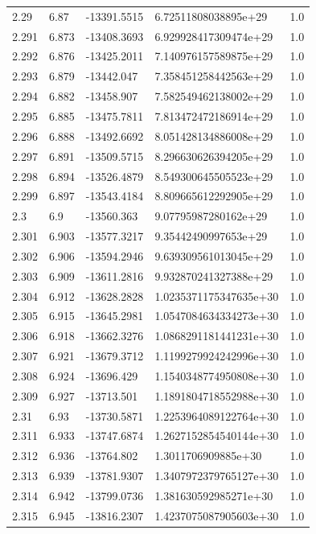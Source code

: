\begin{tabular}{lllll}
2.29 & 6.87 & -13391.5515 & 6.72511808038895e+29 & 1.0 \\
2.291 & 6.873 & -13408.3693 & 6.929928417309474e+29 & 1.0 \\
2.292 & 6.876 & -13425.2011 & 7.140976157589875e+29 & 1.0 \\
2.293 & 6.879 & -13442.047 & 7.358451258442563e+29 & 1.0 \\
2.294 & 6.882 & -13458.907 & 7.582549462138002e+29 & 1.0 \\
2.295 & 6.885 & -13475.7811 & 7.813472472186914e+29 & 1.0 \\
2.296 & 6.888 & -13492.6692 & 8.051428134886008e+29 & 1.0 \\
2.297 & 6.891 & -13509.5715 & 8.296630626394205e+29 & 1.0 \\
2.298 & 6.894 & -13526.4879 & 8.549300645505523e+29 & 1.0 \\
2.299 & 6.897 & -13543.4184 & 8.809665612292905e+29 & 1.0 \\
2.3 & 6.9 & -13560.363 & 9.07795987280162e+29 & 1.0 \\
2.301 & 6.903 & -13577.3217 & 9.35442490997653e+29 & 1.0 \\
2.302 & 6.906 & -13594.2946 & 9.639309561013045e+29 & 1.0 \\
2.303 & 6.909 & -13611.2816 & 9.932870241327388e+29 & 1.0 \\
2.304 & 6.912 & -13628.2828 & 1.0235371175347635e+30 & 1.0 \\
2.305 & 6.915 & -13645.2981 & 1.0547084634334273e+30 & 1.0 \\
2.306 & 6.918 & -13662.3276 & 1.0868291181441231e+30 & 1.0 \\
2.307 & 6.921 & -13679.3712 & 1.1199279924242996e+30 & 1.0 \\
2.308 & 6.924 & -13696.429 & 1.1540348774950808e+30 & 1.0 \\
2.309 & 6.927 & -13713.501 & 1.1891804718552988e+30 & 1.0 \\
2.31 & 6.93 & -13730.5871 & 1.2253964089122764e+30 & 1.0 \\
2.311 & 6.933 & -13747.6874 & 1.2627152854540144e+30 & 1.0 \\
2.312 & 6.936 & -13764.802 & 1.3011706909885e+30 & 1.0 \\
2.313 & 6.939 & -13781.9307 & 1.3407972379765127e+30 & 1.0 \\
2.314 & 6.942 & -13799.0736 & 1.381630592985271e+30 & 1.0 \\
2.315 & 6.945 & -13816.2307 & 1.4237075087905603e+30 & 1.0 \\

\end{tabular}
